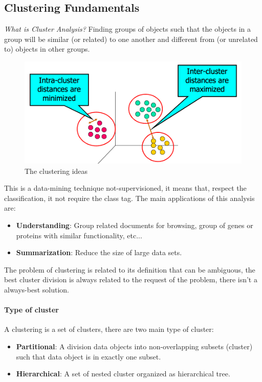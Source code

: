 \documentclass[12pt]{article}
\begin{document}
\subsection{Clustering Fundamentals}
\textit{What is Cluster Analysis?} Finding groups of objects such that the objects in a group will be similar (or related) to one another and different from (or unrelated to) objects in other groups.
\begin{figure}[H]
  \includegraphics[width=\linewidth]{images/clustering.png}
  \caption{The clustering ideas}
  \label{fig:clustering}
\end{figure}
This is a data-mining technique not-supervisioned, it means that, respect the classification, it not require the class tag.
The main applications of this analysis are:
\begin{itemize}
  \item \textbf{Understanding}: Group related documents for browsing, group of genes or proteins with similar functionality, etc...
  \item \textbf{Summarization}: Reduce the size of large data sets.
\end{itemize}
The problem of clustering is related to its definition that can be ambiguous, the best cluster division is always related to the request of the problem, there isn't a always-best solution.\\
\paragraph{Type of cluster} A clustering is a set of clusters, there are two main type of cluster:
\begin{itemize}
  \item \textbf{Partitional}: A division data objects into non-overlapping subsets (cluster) such that data object is in exactly one subset.
  \item \textbf{Hierarchical}: A set of nested cluster organized as hierarchical tree.
\end{itemize}
\end{document}
